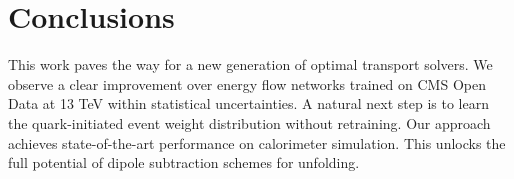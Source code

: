 \section{Conclusions}\label{sec:conclusions}

This work paves the way for a new generation of optimal transport
solvers. We observe a clear improvement over energy flow networks
trained on CMS Open Data at 13 TeV within statistical uncertainties. A
natural next step is to learn the quark-initiated event weight
distribution without retraining. Our approach achieves state-of-the-art
performance on calorimeter simulation. This unlocks the full potential
of dipole subtraction schemes for unfolding.

